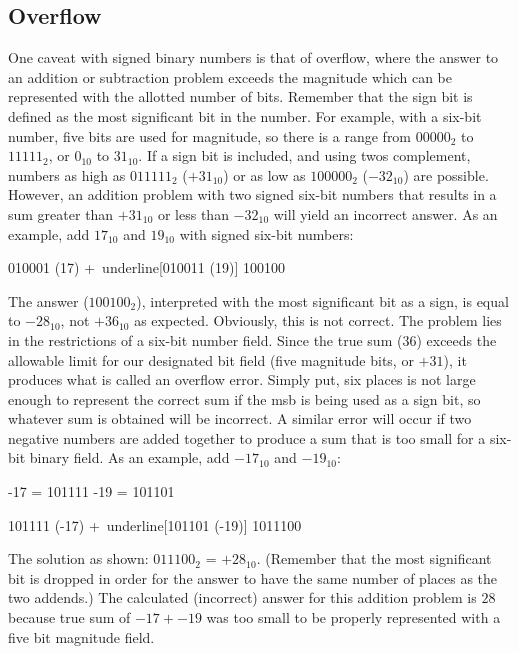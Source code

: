 \subsection{Overflow}
\label{MO:sub:overflow}

One caveat with signed binary numbers is that of overflow, where the answer to an addition or subtraction problem exceeds the magnitude which can be represented with the allotted number of bits. Remember that the sign bit is defined as the most significant bit in the number. For example, with a six-bit number, five bits are used for magnitude, so there is a range from $ 00000_2 $ to $ 11111_2 $, or $ 0_{10} $ to $ 31_{10} $. If a sign bit is included, and using twos complement, numbers as high as $ 011111_2 $ ($ +31_{10} $) or as low as $ 100000_2 $ ($ -32_{10} $) are possible. However, an addition problem with two signed six-bit numbers that results in a sum greater than $ +31_{10} $ or less than $ -32_{10} $ will yield an incorrect answer. As an example, add $ 17_{10} $ and $ 19_{10} $ with signed six-bit numbers: 

\begin{binDisp}[commandchars=~\[\]]
     010001  (17)
    +~underline[010011  (19)]
     100100
\end{binDisp}

The answer ($ 100100_2 $), interpreted with the most significant bit as a sign, is equal to $ -28_{10} $, not $ +36_{10} $ as expected. Obviously, this is not correct. The problem lies in the restrictions of a six-bit number field. Since the true sum ($ 36 $) exceeds the allowable limit for our designated bit field (five magnitude bits, or $ +31 $), it produces what is called an overflow error. Simply put, six places is not large enough to represent the correct sum if the \gls{msb} is being used as a sign bit, so whatever sum is obtained will be incorrect. A similar error will occur if two negative numbers are added together to produce a sum that is too small for a six-bit binary field. As an example, add $ -17_{10} $ and $ -19_{10} $: 

\begin{binDisp}[commandchars=~\[\]]
     -17 = 101111
     -19 = 101101

     101111  (-17)
    +~underline[101101  (-19)]
    1011100
\end{binDisp}

The solution as shown: $ 011100_2 $ = $ +28_{10} $. (Remember that the most significant bit is dropped in order for the answer to have the same number of places as the two addends.) The calculated (incorrect) answer for this addition problem is $ 28 $ because true sum of $ -17 + -19 $ was too small to be properly represented with a five bit magnitude field.

